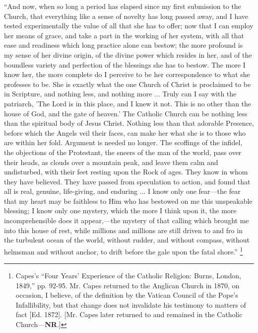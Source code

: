 ``And now, when so long a period has elapsed since
my first submission to the Church, that everything like a
sense of novelty has long passed away, and I have tested
experimentally the value of all that she has to offer;
now that I can employ her means of grace, and take a part
in the working of her system, with all that ease and
readiness which long practice alone can bestow; the more
profound is my sense of her divine origin, of the divine
power which resides in her, and of the boundless variety
and perfection of the blessings she has to bestow. The
more I know her, the more complete do I perceive to be
her correspondence to what she professes to be. She is
exactly what the one Church of Christ is proclaimed to be
in Scripture, and nothing less, and nothing more ...
Truly can I say with the patriarch, 'The Lord is in this
place, and I knew it not. This is no other than the house
of God, and the gate of heaven.' The Catholic Church can
be nothing less than the spiritual body of Jesus Christ.
Nothing less than that adorable Presence, before which
the Angels veil their faces, can make her what she is to
those who are within her fold. Argument is needed no
longer. The scoffings of the infidel, the objections of
the Protestant, the sneers of the man of the world, pass
over their heads, as clouds over a mountain peak, and
leave them calm and undisturbed, with their feet resting
upon the Rock of ages. They know in whom they have
believed. They have passed from speculation to action,
and found that all is real, genuine, life-giving, and
enduring ... I know only one fear—the fear that my heart
may be faithless to Him who has bestowed on me this
unspeakable blessing; I know only one mystery, which the
more I think upon it, the more incomprehensible does it appear,—the mystery of that calling which brought me
into this house of rest, while millions and millions are
still driven to and fro in the turbulent ocean of the
world, without rudder, and without compass, without
helmsman and without anchor, to drift before the gale
upon the fatal shore.'' \footnote{Capes's ``Four Years'
Experience of the Catholic Religion: Burns, London,
1849,'' pp. 92-95. Mr. Capes returned to the Anglican
Church in 1870, on occasion, I believe, of the definition
by the Vatican Council of the Pope's Infallibility, but
that change does not invalidate his testimony to matters
of fact [Ed. 1872]. [Mr. Capes later returned to and remained in the
Catholic Church—\textbf{NR}.]}


